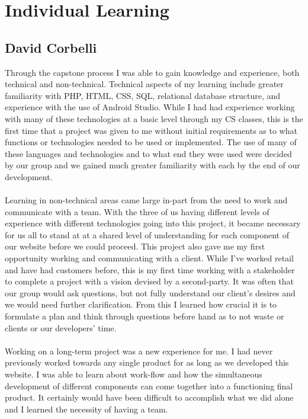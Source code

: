 \documentclass[onecolumn, draftclsnofoot,10pt, compsoc]{IEEEtran}
\begin{document}
\newpage
\section{Individual Learning}
\subsection{David Corbelli}
\noindent Through the capstone process I was able to gain knowledge and experience, both technical and non-technical. Technical aspects of my learning include greater familiarity with PHP, HTML, CSS, SQL, relational database structure, and experience with the use of Android Studio. While I had had experience working with many of these technologies at a basic level through my CS classes, this is the first time that a project was given to me without initial requirements as to what functions or technologies needed to be used or implemented. The use of many of these languages and technologies and to what end they were used were decided by our group and we gained much greater familiarity with each by the end of our development.
\\ \\
Learning in non-technical areas came large in-part from the need to work and communicate with a team. With the three of us having different levels of experience with different technologies going into this project, it became necessary for us all to stand at at a shared level of understanding for each component of our website before we could proceed. This project also gave me my first opportunity working and communicating with a client. While I've worked retail and have had customers before, this is my first time working with a stakeholder to complete a project with a vision devised by a second-party. It was often that our group would ask questions, but not fully understand our client's desires and we would need further clarification. From this I learned how crucial it is to formulate a plan and think through questions before hand as to not waste or clients or our developers' time.
\\ \\
Working on a long-term project was a new experience for me. I had never previously worked towards any single product for as long as we developed this website. I was able to learn about work-flow and how the simultaneous development of different components can come together into a functioning final product. It certainly would have been difficult to accomplish what we did alone and I learned the necessity of having a team.
\end{document}

